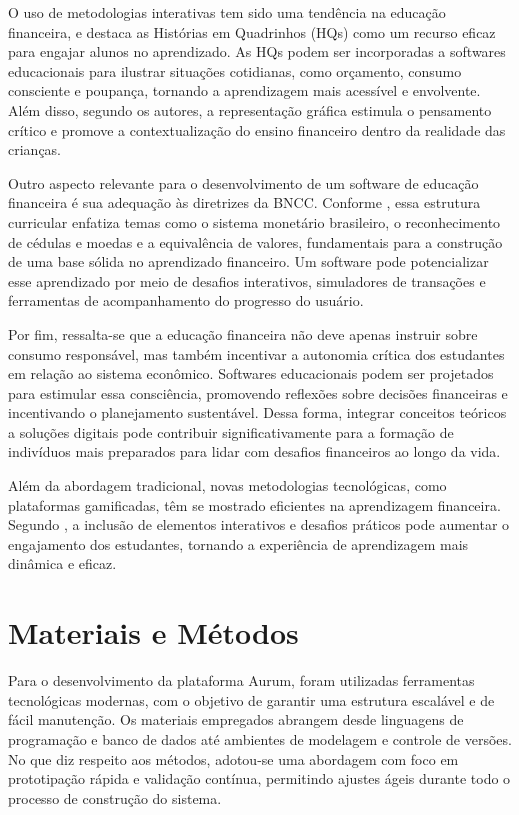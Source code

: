 \documentclass[
	article,			%
	12pt,				%
	oneside,			%
	a4paper,			%
	english,			%
	brazil,				%
	sumario=tradicional
	]{abntex2}
\begin{document}
    O uso de metodologias interativas tem sido uma tendência na educação financeira, e  destaca as Histórias em Quadrinhos (HQs) como um recurso eficaz para engajar alunos no aprendizado. As HQs podem ser incorporadas a softwares educacionais para ilustrar situações cotidianas, como orçamento, consumo consciente e poupança, tornando a aprendizagem mais acessível e envolvente. Além disso, segundo os autores, a representação gráfica estimula o pensamento crítico e promove a contextualização do ensino financeiro dentro da realidade das crianças.

    Outro aspecto relevante para o desenvolvimento de um software de educação financeira é sua adequação às diretrizes da BNCC. Conforme , essa estrutura curricular enfatiza temas como o sistema monetário brasileiro, o reconhecimento de cédulas e moedas e a equivalência de valores, fundamentais para a construção de uma base sólida no aprendizado financeiro. Um software pode potencializar esse aprendizado por meio de desafios interativos, simuladores de transações e ferramentas de acompanhamento do progresso do usuário.

    Por fim, ressalta-se que a educação financeira não deve apenas instruir sobre consumo responsável, mas também incentivar a autonomia crítica dos estudantes em relação ao sistema econômico. Softwares educacionais podem ser projetados para estimular essa consciência, promovendo reflexões sobre decisões financeiras e incentivando o planejamento sustentável. Dessa forma, integrar conceitos teóricos a soluções digitais pode contribuir significativamente para a formação de indivíduos mais preparados para lidar com desafios financeiros ao longo da vida.

    Além da abordagem tradicional, novas metodologias tecnológicas, como plataformas gamificadas, têm se mostrado eficientes na aprendizagem financeira. Segundo , a inclusão de elementos interativos e desafios práticos pode aumentar o engajamento dos estudantes, tornando a experiência de aprendizagem mais dinâmica e eficaz.

\section{Materiais e Métodos}
Para o desenvolvimento da plataforma Aurum, foram utilizadas ferramentas tecnológicas modernas, com o objetivo de garantir uma estrutura escalável e de fácil manutenção. Os materiais empregados abrangem desde linguagens de programação e banco de dados até ambientes de modelagem e controle de versões. No que diz respeito aos métodos, adotou-se uma abordagem com foco em prototipação rápida e validação contínua, permitindo ajustes ágeis durante todo o processo de construção do sistema.
\end{document}

